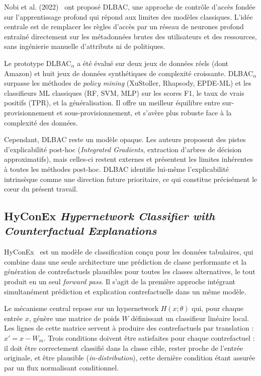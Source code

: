 \documentclass[12pt,a4paper]{article}
\begin{document}
Nobi et al. (2022)~\cite{nobi2022} ont propos\'e DLBAC, une approche de contr\^ole d'acc\`es fond\'ee sur l'apprentissage profond qui r\'epond aux limites des mod\`eles classiques. L'id\'ee centrale est de remplacer les r\`egles d'acc\`es par un r\'eseau de neurones profond entra\^in\'e directement sur les m\'etadonn\'ees brutes des utilisateurs et des ressources, sans ing\'enierie manuelle d'attributs ni de politiques.

Le prototype DLBAC$_\alpha$ a \'et\'e \'evalu\'e sur deux jeux de donn\'ees r\'eels (dont Amazon) et huit jeux de donn\'ees synth\'etiques de complexit\'e croissante. DLBAC$_\alpha$ surpasse les m\'ethodes de \textit{policy mining} (XuStoller, Rhapsody, EPDE-ML) et les classifieurs ML classiques (RF, SVM, MLP) sur les scores F1, le taux de vrais positifs (TPR), et la g\'en\'eralisation. Il offre un meilleur \'equilibre entre sur-provisionnement et sous-provisionnement, et s'av\`ere plus robuste face \`a la complexit\'e des donn\'ees.

Cependant, DLBAC reste un mod\`ele opaque. Les auteurs proposent des pistes d'explicabilit\'e post-hoc (\textit{Integrated Gradients}, extraction d'arbres de d\'ecision approximatifs), mais celles-ci restent externes et pr\'esentent les limites inh\'erentes \`a toutes les m\'ethodes post-hoc. DLBAC identifie lui-m\^eme l'explicabilit\'e intrins\`eque comme une direction future prioritaire, ce qui constitue pr\'ecis\'ement le c{\oe}ur du pr\'esent travail.

\subsection{HyConEx \textit{Hypernetwork Classifier with Counterfactual Explanations}}

HyConEx~\cite{hyconex2026} est un mod\`ele de classification con\c{c}u pour les donn\'ees tabulaires, qui combine dans une seule architecture une pr\'ediction de classe performante et la g\'en\'eration de contrefactuels plausibles pour toutes les classes alternatives, le tout produit en un seul \textit{forward pass}. Il s'agit de la premi\`ere approche int\'egrant simultan\'ement pr\'ediction et explication contrefactuelle dans un m\^eme mod\`ele.

Le m\'ecanisme central repose sur un hypernetwork $H(x;\theta)$ qui, pour chaque entr\'ee $x$, g\'en\`ere une matrice de poids $W$ d\'efinissant un classifieur lin\'eaire local. Les lignes de cette matrice servent \`a produire des contrefactuels par translation : $x' = x - W_m$. Trois conditions doivent \^etre satisfaites pour chaque contrefactuel : il doit \^etre correctement classifi\'e dans la classe cible, rester proche de l'entr\'ee originale, et \^etre plausible (\textit{in-distribution}), cette derni\`ere condition \'etant assur\'ee par un flux normalisant conditionnel.
\end{document}
